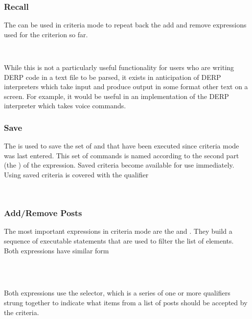 \subsubsection{Recall}
The  can be used in criteria mode to repeat back the add and remove expressions used for the 
criterion so far.
\begin{center}
      \\
\end{center}
While this is not a particularly useful functionality for users who are writing DERP code in a text file to be 
parsed, it exists in anticipation of DERP interpreters which take input and produce output in some format other 
text on a screen. For example, it would be useful in an implementation of the DERP interpreter which takes voice 
commands.


\subsubsection{Save}
The  is used to save the set of  and  that have been executed since 
criteria mode was last entered. This set of commands is named according to the second part (the ) of the 
expression. Saved criteria become available for use immediately. Using saved criteria is covered with the  qualifier
\begin{center}
      \\
\end{center}

\subsubsection{Add/Remove Posts}
The most important expressions in criteria mode are the  and . They build a sequence of 
executable statements that are used to filter the list of elements. Both expressions have similar form
\begin{center}
      \\
      \\
\end{center}
Both expressions use the selector, which is a series of one or more qualifiers strung together to indicate what 
items from a list of posts should be accepted by the criteria.

